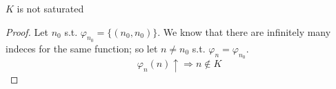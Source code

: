 \begin{corollary}
  $K$ is not saturated
  \begin{proof}
    Let $n_0$ s.t. $\varphi_{n_0} = \{(n_0, n_0)\}$. We know that
    there are infinitely many indeces for the same function; so let
    $n \neq n_0$ s.t. $\varphi_n = \varphi_{n_0}$.
    \[
      \varphi_n(n) \uparrow \Rightarrow n \notin K
    \]
  \end{proof}
\end{corollary}